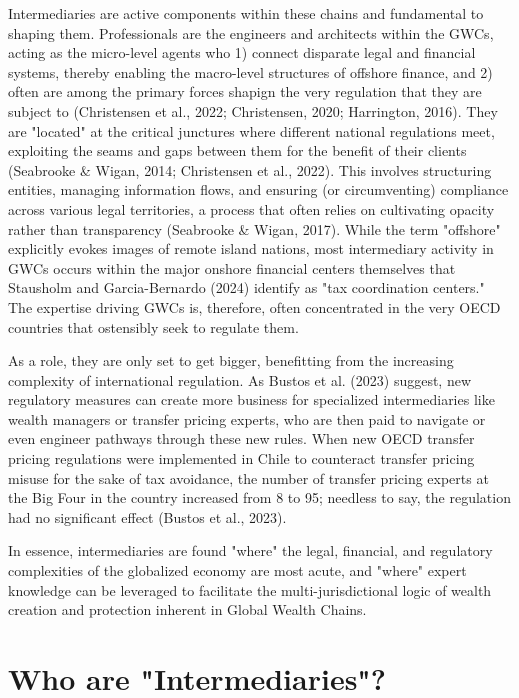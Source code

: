 Intermediaries are active components within these chains and fundamental to shaping them. Professionals are the engineers and architects within the GWCs, acting as the micro-level agents who 1) connect disparate legal and financial systems, thereby enabling the macro-level structures of offshore finance, and 2) often are among the primary forces shapign the very regulation that they are subject to (Christensen et al., 2022; Christensen, 2020; Harrington, 2016). They are "located" at the critical junctures where different national regulations meet, exploiting the seams and gaps between them for the benefit of their clients (Seabrooke \& Wigan, 2014; Christensen et al., 2022). This involves structuring entities, managing information flows, and ensuring (or circumventing) compliance across various legal territories, a process that often relies on cultivating opacity rather than transparency (Seabrooke \& Wigan, 2017). While the term "offshore" explicitly evokes images of remote island nations, most intermediary activity in GWCs occurs within the major onshore financial centers themselves that Stausholm and Garcia-Bernardo (2024) identify as "tax coordination centers." The expertise driving GWCs is, therefore, often concentrated in the very OECD countries that ostensibly seek to regulate them. 

As a role, they are only set to get bigger, benefitting from the increasing complexity of international regulation. As Bustos et al. (2023) suggest, new regulatory measures can create more business for specialized intermediaries like wealth managers or transfer pricing experts, who are then paid to navigate or even engineer pathways through these new rules. When new OECD transfer pricing regulations were implemented in Chile to counteract transfer pricing misuse for the sake of tax avoidance, the number of transfer pricing experts at the Big Four in the country increased from 8 to 95; needless to say, the regulation had no significant effect (Bustos et al., 2023).

In essence, intermediaries are found "where" the legal, financial, and regulatory complexities of the globalized economy are most acute, and "where" expert knowledge can be leveraged to facilitate the multi-jurisdictional logic of wealth creation and protection inherent in Global Wealth Chains.

\section{Who are "Intermediaries"?} 

